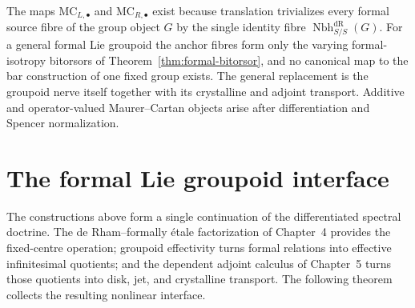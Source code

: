 \begin{remark}
\label{rem:no-general-fixed-group-mc}
The maps $\mathrm{MC}_{L,\bullet}$ and $\mathrm{MC}_{R,\bullet}$ exist because translation trivializes every
formal source fibre of the group object $G$ by the single identity fibre
$\operatorname{Nbh}^{\mathrm{dR}}_{S/S}(G)$.  For a general formal Lie groupoid the anchor fibres form only the varying
formal-isotropy bitorsors of Theorem~\ref{thm:formal-bitorsor}, and no canonical map to the bar construction of one fixed group
exists.  The general replacement is the groupoid nerve itself together with
its crystalline and adjoint transport.  Additive and operator-valued
Maurer--Cartan objects arise after differentiation and Spencer normalization.
\end{remark}

\section{The formal Lie groupoid interface}
\label{sec:flg-synthesis}

The constructions above form a single continuation of the differentiated
spectral doctrine.  The de Rham--formally \'etale factorization of Chapter~4
provides the fixed-centre operation; groupoid effectivity turns formal
relations into effective infinitesimal quotients; and the dependent adjoint
calculus of Chapter~5 turns those quotients into disk, jet, and crystalline
transport.  The following theorem collects the resulting nonlinear interface.

